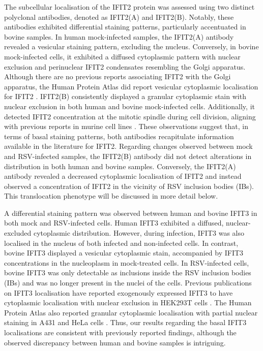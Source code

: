 The subcellular localisation of the IFIT2 protein was assessed using two distinct polyclonal antibodies, denoted as IFIT2(A) and IFIT2(B). Notably, these antibodies exhibited differential staining patterns, particularly accentuated in bovine samples. In human mock-infected samples, the IFIT2(A) antibody revealed a vesicular staining pattern, excluding the nucleus. Conversely, in bovine mock-infected cells, it exhibited a diffused cytoplasmic pattern with nuclear exclusion and perinuclear IFIT2 condensates resembling the Golgi apparatus. Although there are no previous reports associating IFIT2 with the Golgi apparatus, the Human Protein Atlas did report vesicular cytoplasmic localisation for IFIT2 \cite{Thul2017AProteome}. IFIT2(B) consistently displayed a granular cytoplasmic stain with nuclear exclusion in both human and bovine mock-infected cells. Additionally, it detected IFIT2 concentration at the mitotic spindle during cell division, aligning with previous reports in murine cell lines \cite{Saha2006IdentificationProtein}. These observations suggest that, in terms of basal staining patterns, both antibodies recapitulate information available in the literature for IFIT2. Regarding changes observed between mock and RSV-infected samples, the IFIT2(B) antibody did not detect alterations in distribution in both human and bovine samples. Conversely, the IFIT2(A) antibody revealed a decreased cytoplasmic localisation of IFIT2 and instead observed a concentration of IFIT2 in the vicinity of RSV inclusion bodies (IBs). This translocation phenotype will be discussed in more detail below.

A differential staining pattern was observed between human and bovine IFIT3 in both mock and RSV-infected cells. Human IFIT3 exhibited a diffused, nuclear-excluded cytoplasmic distribution. However, during infection, IFIT3 was also localised in the nucleus of both infected and non-infected cells. In contrast, bovine IFIT3 displayed a vesicular cytoplasmic stain, accompanied by IFIT3 concentrations in the nucleoplasm in mock-treated cells. In RSV-infected cells, bovine IFIT3 was only detectable as inclusions inside the RSV inclusion bodies (IBs) and was no longer present in the nuclei of the cells. Previous publications on IFIT3 localisation have reported exogenously expressed IFIT3 to have cytoplasmic localisation with nuclear exclusion in HEK293T cells \cite{Huang2008Interferon-inducedCells, Liu2011IFN-InducedTBK1}. The Human Protein Atlas also reported granular cytoplasmic localisation with partial nuclear staining in A431 and HeLa cells \cite{Thul2017AProteome}. Thus, our results regarding the basal IFIT3 localisations are consistent with previously reported findings, although the observed discrepancy between human and bovine samples is intriguing.

